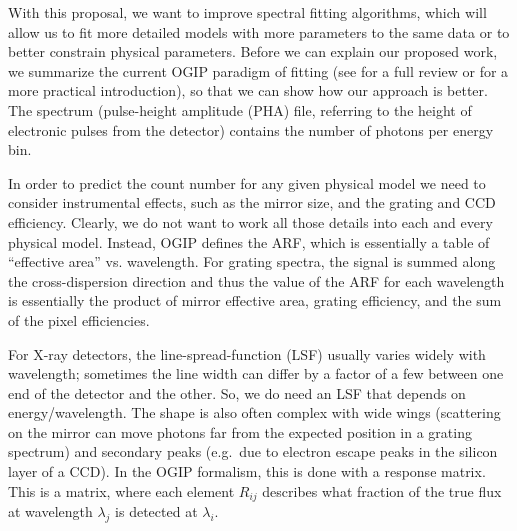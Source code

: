 \documentclass[fleqn,12pt,onecolumn]{SelfArx} %
\begin{document}
With this proposal, we want to improve spectral fitting algorithms, which will allow us to fit more detailed models with more parameters to the same data or to better constrain physical parameters. Before we can explain our proposed work, we summarize the current OGIP paradigm of fitting (see \cite{2011hxra.book.....A} for a full review or \cite{2023hxga.book..150B} for a more practical introduction), so that we can show how our approach is better.
The spectrum (pulse-height amplitude (PHA) file, referring to the height of electronic pulses from the detector) contains the number of photons per energy bin.

In order to predict the count number for any given physical model we need to consider instrumental effects, such as the
mirror size, and the grating and CCD efficiency. Clearly, we do not want to
work all those details into each and every physical model. Instead,
OGIP defines the ARF, which is essentially a table of ``effective area''
vs. wavelength.
For grating spectra, the signal is summed along the cross-dispersion direction
and thus the value of the ARF for each wavelength is essentially the product of
mirror effective area, grating efficiency, and the sum of the pixel
efficiencies.

For X-ray detectors, the line-spread-function (LSF) usually varies widely with wavelength; sometimes the line width can differ by a factor of a few between one end of the detector and the other. So, we do need an LSF that depends on energy/wavelength. The shape is also often complex with wide wings (scattering on the mirror can move photons far from the expected position in a grating spectrum) and secondary peaks (e.g.\ due to electron escape peaks in the silicon layer of a CCD).
In the OGIP formalism, this is done with a response
matrix.
This is a matrix, where each element $R_{ij}$
describes what fraction of the true flux at wavelength $\lambda_j$ is detected
at $\lambda_i$.
\end{document}
